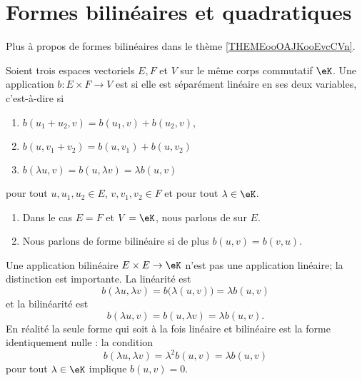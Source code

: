 

\section{Formes bilinéaires et quadratiques}

Plus à propos de formes bilinéaires dans le thème \ref{THEMEooOAJKooEvcCVn}.

\begin{definition}      \label{DEFooEEQGooNiPjHz}
	Soient trois espaces vectoriels \( E,F\) et \( V\) sur le même corps commutatif \( \eK\). Une application \( b\colon E\times F\to V\) est  si elle est séparément linéaire en ses deux variables, c'est-à-dire si
	\begin{enumerate}
		\item
		      \( b(u_1+u_2,v)=b(u_1,v)+b(u_2,v)\),
		\item
		      \( b(u,v_1+v_2)=b(u,v_1)+b(u,v_2)\)
		\item
		      \( b(\lambda u,v)=b(u,\lambda v)=\lambda b(u,v)\)
	\end{enumerate}
	pour tout \( u,u_1,u_2\in E\), \( v,v_1,v_2\in F\) et pour tout \( \lambda\in \eK\).

	\begin{enumerate}
		\item

		      Dans le cas \( E=F\) et \( V=\eK\), nous parlons de  sur \( E\).
		\item

		      Nous parlons de forme bilinéaire  si de plus \( b(u,v)=b(v,u)\).
	\end{enumerate}
\end{definition}

\begin{normaltext}
	Une application bilinéaire \( E\times E\to \eK\) n'est pas une application linéaire; la distinction est importante. La linéarité est
	\begin{equation}
		b(\lambda u,\lambda v)= b\big( \lambda(u,v) \big)=\lambda b(u,v)
	\end{equation}
	et la bilinéarité est
	\begin{equation}
		b(\lambda u,v)=b(u,\lambda v)=\lambda b(u,v).
	\end{equation}
	En réalité la seule forme qui soit à la fois linéaire et bilinéaire est la forme identiquement nulle : la condition
	\begin{equation}
		b(\lambda u,\lambda v)=\lambda^2b(u,v)=\lambda b(u,v)
	\end{equation}
	pour tout \( \lambda\in \eK\) implique \( b(u,v)=0\).
\end{normaltext}

